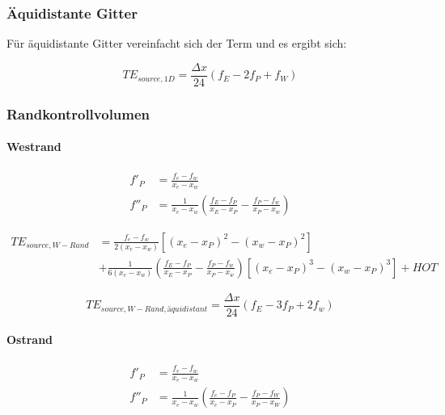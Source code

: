 \subsubsection{Äquidistante Gitter}

Für äquidistante Gitter vereinfacht sich der Term und es ergibt sich:

\begin{equation*}
  TE_{source, 1D} = \frac{\Delta x}{24} \left({f_E-2f_P+f_W}\right)
\end{equation*}

\subsubsection{Randkontrollvolumen}

\paragraph{Westrand}



\begin{align*}
  f'_P &=\frac{f_e-f_w}{x_e-x_w}\\
  f''_P &= \frac{1}{x_e-x_w}\left(\frac{f_E-f_P}{x_E-x_P}-\frac{f_P-f_w}{x_P-x_w}\right)
\end{align*}

\begin{align}
  TE_{source, W-Rand} &=
 \frac{f_e-f_w}{2(x_e-x_w)}  \left[{(x_e-x_P)^2-(x_w-x_P)^2}\right]\nonumber\\
&+\frac{1}{6(x_e-x_w)}\left(\frac{f_E-f_P}{x_E-x_P}-\frac{f_P-f_w}{x_P-x_w}\right)
  \left[{{(x_e-x_P)}^3-{(x_w-x_P)}^3}\right] + HOT
\end{align}

\begin{equation*}
  TE_{source, W-Rand, äquidistant} = \frac{\Delta x}{24} \left({f_E-3f_P+2f_w}\right)
\end{equation*}


\paragraph{Ostrand}

\begin{align*}
  f'_P &=\frac{f_e-f_w}{x_e-x_w}\\
  f''_P &= \frac{1}{x_e-x_w}\left(\frac{f_e-f_P}{x_e-x_P}-\frac{f_P-f_W}{x_P-x_W}\right)
\end{align*}

